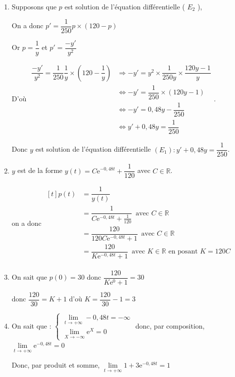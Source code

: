 \documentclass[10pt]{article}
\providecommand{\R}{\mathbb{R}}
\providecommand{\e}{{\mathrm{e}}}
\begin{document}
\begin{enumerate}
\item Supposons que $p$ est solution de l'équation différentielle ( $E_{2}$ ),

On a donc $p'=\dfrac{1}{250} p \times(120-p)$ 

Or $p=\dfrac{1}{y}$ et $p'= \dfrac{-y'}{y^2}$ 

D'où  $\begin{aligned} \dfrac{-y'}{y^2}= \dfrac{1}{250} \dfrac{1}{y} \times\left( 120-\dfrac{1}{y}\right)& \Longrightarrow -y'=y^2 \times  \dfrac{1}{250y }\times \dfrac{120y-1}{y}\\
&\Longleftrightarrow -y' = \dfrac{1}{250} \times (120y-1)\\
&\Longleftrightarrow -y'= 0,48 y -\dfrac{1}{250}\\
&\Longleftrightarrow y'+0,48 y=\dfrac{1}{250}
\end{aligned}$.

Donc $y$ est solution de l'équation différentielle $\left(E_{1}\right): y'+0,48 y=\dfrac{1}{250}$.

\item $y$ est de la forme $y(t)=C \e^{-0,48t} + \dfrac{1}{120}$ avec $C \in \R$.

on a donc $\begin{aligned}[t] p(t)& = \dfrac{1}{y(t)}\\
& = \dfrac{1}{C \e^{-0,48t} + \frac{1}{120}} \, \text{ avec } C \in \R\\
& = \dfrac{120}{120 C \e^{-0,48t} +1 } \, \text{ avec } C \in \R\\
& = \dfrac{120}{K \e^{-0,48t} +1 } \, \text{ avec } K \in \R \text { en posant }  K=120C\\
\end{aligned}$

\item  On sait que  $p(0)=30$ donc $\dfrac{120}{K \e^{0} +1 }=30$ 

donc $\dfrac{120}{30}= K+1$   d'où $K =\dfrac{120}{30}-1=3$

\item On sait que : $\begin{cases}
\lim\limits_{t \to +\infty }-0,48t= -\infty \\
\lim\limits_{X\to -\infty} \e^X = 0
\end{cases}$ donc, par composition, $\lim\limits_{t\to +\infty }\e^{-0,48t}=0$ 

Donc, par produit et somme, $\lim\limits_{t \to +\infty}1+3\e^{-0,48t}=1$ 


\end{enumerate}
\end{document}
